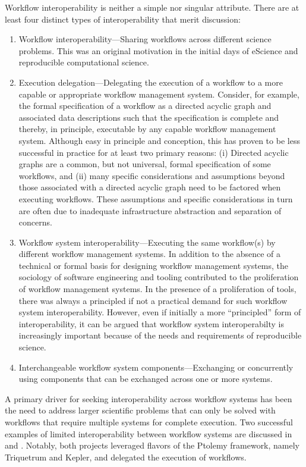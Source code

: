Workflow interoperability is neither a simple nor singular attribute. There
are at least four distinct types of interoperability that merit discussion:


\begin{enumerate}

\item Workflow interoperability---Sharing workflows across different science
problems. This was an original motivation in the initial days of eScience  and
reproducible computational science. 

\item Execution delegation---Delegating the execution of a workflow to a more
capable or appropriate workflow management system. Consider, for example, the
formal specification of a workflow as a directed acyclic graph and associated
data descriptions such that the specification is complete and thereby, in
principle, executable by any capable workflow management system.  Although
easy in principle and conception, this has proven to be less successful
in practice for at least two primary reasons: (i) Directed acyclic graphs are a
common, but not universal, formal specification of some workflows, and (ii)
many specific considerations and assumptions beyond those associated with a
directed acyclic graph need to be factored when executing workflows. These
assumptions and specific considerations in turn are often due to inadequate
infrastructure abstraction and separation of concerns.

\item Workflow system interoperability---Executing the same workflow(s) by
different workflow management systems. In addition to the absence of a
technical or formal basis for designing workflow management systems, the
sociology of software engineering and tooling contributed to the proliferation
of workflow management systems. In the presence of a proliferation of tools,
there was always a principled if not a practical demand for such workflow
system interoperability. However, even if initially a  more  ``principled'' form
of interoperability, it can be argued that workflow system interoperabilty is
increasingly important because of the needs and requirements of reproducible
science.

\item Interchangeable workflow system components---Exchanging or
concurrently using components that can be exchanged across
one or more systems.

\end{enumerate} 

A primary driver for seeking interoperability across workflow systems
has been the need to address larger scientific problems that can only be
solved with workflows that require multiple systems for complete execution.
Two successful examples of limited interoperability between workflow systems
are discussed in \cite{brooks_triquetrum:_2015} and
\cite{mandal_integrating_2007}. Notably, both projects leveraged flavors of
the Ptolemy framework, namely Triquetrum and Kepler, and delegated the
execution of workflows. 
